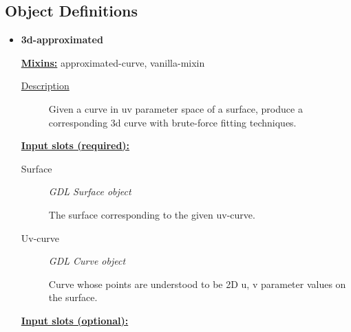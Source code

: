 \documentclass [11pt]{book}
\begin{document}
\subsection{Object Definitions}

\label{subsec:objectdefinitions}



\begin{itemize}

\item {}
\label{prim:3d-approximated}
\textbf{3d-approximated}


\textbf{
\underline{Mixins:}} approximated-curve, vanilla-mixin





\begin{description}

\item [
\underline{Description}]


Given a curve in uv parameter space of
  a surface, produce a corresponding 3d curve with brute-force fitting
  techniques.



\end{description}








\textbf{
\underline{Input slots (required):}}

\begin{description}

\item [Surface]
\emph{GDL Surface object}

 The surface corresponding to the given uv-curve.




\item [Uv-curve]
\emph{GDL Curve object}

 Curve whose points are understood to be 2D u, v
parameter values on the surface.




\end{description}






\textbf{
\underline{Input slots (optional):}}

\begin{description}


\end{description}
\end{itemize}
\end{document}
